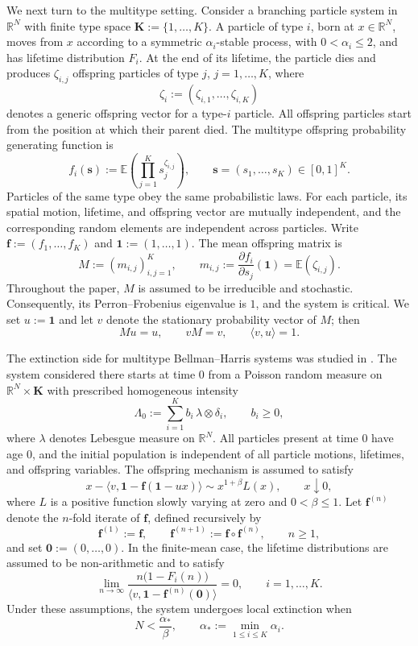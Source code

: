 \documentclass[reqno,final,11pt]{amsart}
\newcommand{\R}{\mathbb R}
\newcommand{\E}{\mathbb E}
\newcommand{\Kk}{\mathbf K}
\newcommand{\one}{\mathbf 1}
\newcommand{\ip}[2]{\langle #1,#2\rangle}
\theoremstyle{plain}
\theoremstyle{definition}
\theoremstyle{remark}
\numberwithin{equation}{section}
\begin{document}
We next turn to the multitype setting. Consider a branching particle system in \(\R^N\) with finite type space \(\Kk:=\{1,\dots,K\}\). A particle of type \(i\), born at \(x\in\R^N\), moves from \(x\) according to a symmetric \(\alpha_i\)-stable process, with \(0<\alpha_i\le2\), and has lifetime distribution \(F_i\). At the end of its lifetime, the particle dies and produces \(\zeta_{i,j}\) offspring particles of type \(j\), \(j=1,\dots,K\), where
\[
  \zeta_i:=(\zeta_{i,1},\dots,\zeta_{i,K})
\]
denotes a generic offspring vector for a type-\(i\) particle. All offspring particles start from the position at which their parent died. The multitype offspring probability generating function is
\[
  f_i(\mathbf s):=\E\left(\prod_{j=1}^K s_j^{\zeta_{i,j}}\right),
  \qquad
  \mathbf s=(s_1,\dots,s_K)\in[0,1]^K.
\]
Particles of the same type obey the same probabilistic laws. For each particle, its spatial motion, lifetime, and offspring vector are mutually independent, and the corresponding random elements are independent across particles. Write \(\mathbf f:=(f_1,\dots,f_K)\) and \(\one:=(1,\dots,1)\). The mean offspring matrix is
\[
  M:=(m_{i,j})_{i,j=1}^K,
  \qquad
  m_{i,j}:=\frac{\partial f_i}{\partial s_j}(\one)
  =\E(\zeta_{i,j}).
\]
Throughout the paper, \(M\) is assumed to be irreducible and stochastic. Consequently, its Perron--Frobenius eigenvalue is \(1\), and the system is critical. We set \(u:=\one\) and let \(v\) denote the stationary probability vector of \(M\); then
\[
  Mu=u,\qquad vM=v,\qquad \ip{v}{u}=1.
\]

The extinction side for multitype Bellman--Harris systems was studied in \cite{Kevei}. The system considered there starts at time \(0\) from a Poisson random measure on \(\R^N\times\Kk\) with prescribed homogeneous intensity
\[
  \Lambda_0:=\sum_{i=1}^K b_i\,\lambda\otimes\delta_i,
  \qquad b_i\ge0,
\]
where \(\lambda\) denotes Lebesgue measure on \(\R^N\). All particles present at time \(0\) have age \(0\), and the initial population is independent of all particle motions, lifetimes, and offspring variables. The offspring mechanism is assumed to satisfy
\[
  x-\ip{v}{\one-\mathbf f(\one-ux)}
  \sim x^{1+\beta}L(x),
  \qquad x\downarrow0,
\]
where \(L\) is a positive function slowly varying at zero and \(0<\beta\le1\). Let \(\mathbf f^{(n)}\) denote the \(n\)-fold iterate of \(\mathbf f\), defined recursively by
\[
  \mathbf f^{(1)}:=\mathbf f,
  \qquad
  \mathbf f^{(n+1)}:=\mathbf f\circ\mathbf f^{(n)},
  \qquad n\ge1,
\]
and set \(\mathbf 0:=(0,\dots,0)\). In the finite-mean case, the lifetime distributions are assumed to be non-arithmetic and to satisfy
\[
  \lim_{n\to\infty}
  \frac{n\bigl(1-F_i(n)\bigr)}
       {\ip{v}{\one-\mathbf f^{(n)}(\mathbf 0)}}
  =0,
  \qquad i=1,\dots,K.
\]
Under these assumptions, the system undergoes local extinction when
\[
  N<\frac{\alpha_*}{\beta},
  \qquad
  \alpha_*:=\min_{1\le i\le K}\alpha_i.
\]
\end{document}
